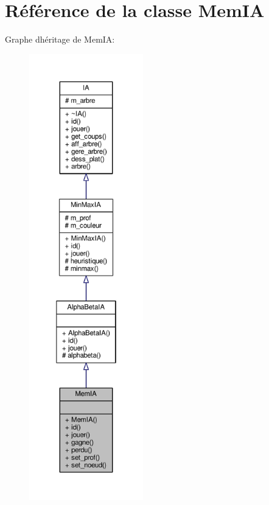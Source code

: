 \hypertarget{classMemIA}{}\section{Référence de la classe Mem\+IA}
\label{classMemIA}


Graphe d\textquotesingle{}héritage de Mem\+IA\+:\nopagebreak
\begin{figure}[H]
\begin{center}
\leavevmode
\includegraphics[height=550pt]{classMemIA__inherit__graph}
\end{center}
\end{figure}


